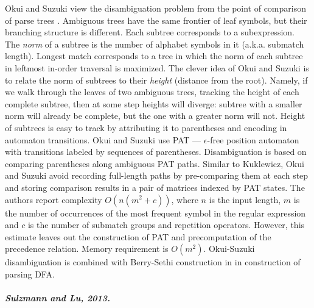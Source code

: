 \documentclass[AMA,STIX1COL]{WileyNJD-v2}
\begin{document}
Okui and Suzuki view the disambiguation problem from the point of comparison of parse trees \cite{OS13}.
Ambiguous trees have the same frontier of leaf symbols, but their branching structure is different.
Each subtree corresponds to a subexpression.
The \emph{norm} of a subtree is the number of alphabet symbols in it (a.k.a. submatch length).
Longest match corresponds to a tree in which the norm of each subtree in leftmost in-order traversal is maximized.
The clever idea of Okui and Suzuki is to relate the norm of subtrees to their \emph{height} (distance from the root).
Namely, if we walk through the leaves of two ambiguous trees, tracking the height of each complete subtree,
then at some step heights will diverge:
subtree with a smaller norm will already be complete, but the one with a greater norm will not.
Height of subtrees is easy to track by attributing it to parentheses and encoding in automaton transitions.
Okui and Suzuki use PAT --- $\epsilon$-free position automaton with transitions labeled by sequences of parentheses.
Disambiguation is based on comparing parentheses along ambiguous PAT paths.
Similar to Kuklewicz, Okui and Suzuki avoid recording full-length paths
by pre-comparing them at each step and storing comparison results in a pair of matrices indexed by PAT states.
The authors report complexity $O(n(m^2 + c))$, where
$n$ is the input length,
$m$ is the number of occurrences of the most frequent symbol in the regular expression
and $c$ is the number of submatch groups and repetition operators.
However, this estimate leaves out the construction of PAT and precomputation of the precedence relation.
Memory requirement is $O(m^2)$.
Okui-Suzuki disambiguation is combined with Berry-Sethi construction in \cite{Bor15} in construction of parsing DFA.

\subparagraph{Sulzmann and Lu, 2013.}
\end{document}
